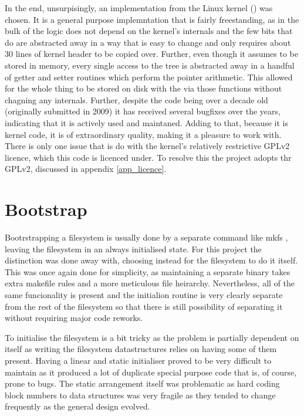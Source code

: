         In the end, unsurpisingly, an implementation from the Linux kernel
        () was chosen. It is a general purpose
        \bplustree implemntation that is fairly freestanding, as in the bulk of
        the logic does not depend on the kernel's internals and the few bits
        that do are abstracted away in a way that is easy to change and only
        requires about 30 lines of kernel header to be copied over. Further,
        even though it assumes to be stored in memory, every single access to
        the tree is abstracted away in a handful of getter and setter routines
        which perform the pointer arithmetic. This allowed for the whole thing
        to be stored on disk with the via those functions without chagning any
        internals. Further, despite the code being over a decade old
        (originally submitted in 2009) it has received several bugfixes over
        the years, indicating that it is actively used and maintaned. Adding to
        that, because it is kernel code, it is of extraordinary quality, making
        it a pleasure to work with. There is only one issue that is do with the
        kernel's relatively restrictive GPLv2 licence, which this code is
        licenced under. To resolve this the project adopts thr GPLv2, discussed
        in appendix \ref{app_licence}.

    \section{Bootstrap}

        Bootrstrapping a filesystem is usually done by a separate command like
        mkfs \cite{man mkfs}, leaving the filesystem in an always initialised
        state. For this project the distinction was done away with, choosing
        instead for the filesystem to do it itself. This was once again done
        for simplicity, as maintaining a separate binary takes extra makefile
        rules and a more meticulous file heirarchy. Nevertheless, all of the
        same funcionality is present and the initialion routine is very clearly
        separate from the rest of the filesystem so that there is still
        possibility of separating it without requiring major code reworks.

        To initialise the filesystem is a bit tricky as the problem is
        partially dependent on itself as writing the filesystem datastructures
        relies on having some of them present. Having a linear and static
        initialiser proved to be very difficult to maintain as it produced a
        lot of duplicate special purpose code that is, of course, prone to
        bugs. The static arrangement itself was problematic as hard coding
        block numbers to data structures was very fragile as they tended to
        change frequently as the general design evolved.


